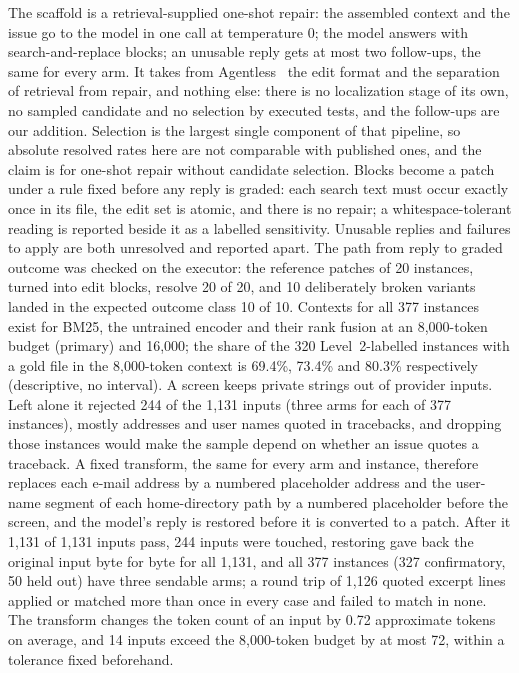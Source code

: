 \documentclass[10pt,twocolumn]{article}
\makeatletter
\renewcommand\paragraph{\@startsection{paragraph}{4}{\z@}{3pt}{-0.5em}{\normalfont\bfseries}}
\makeatother
\begin{document}
\paragraph{Scaffold and edit rules.} The scaffold is a retrieval-supplied one-shot repair: the assembled context and the issue go to the model in one
call at temperature 0; the model answers with search-and-replace blocks; an unusable reply gets at most two follow-ups, the same for every arm.
It takes from Agentless~\cite{agentless} the edit format and the separation of retrieval from repair, and nothing else: there is no localization stage of
its own, no sampled candidate and no selection by executed tests, and the follow-ups are our addition. Selection is the largest single component
of that pipeline, so absolute resolved rates here are not comparable with published ones, and the claim is for one-shot repair without candidate selection. %
Blocks become a patch under a rule fixed before any reply is graded: each search text must occur exactly once in its file, the edit set is
atomic, and there is no repair; a whitespace-tolerant reading is reported beside it as a labelled sensitivity. %
Unusable replies and failures to apply are both unresolved and reported apart. The path from reply to graded outcome was checked
on the executor: the reference patches of 20 instances, turned into edit blocks, resolve 20 of 20, and 10 deliberately broken variants
landed in the expected outcome class 10 of 10. %
Contexts for all 377 instances exist for BM25, the untrained encoder and their rank fusion at an 8,000-token budget (primary) and 16,000;
the share of the 320 Level~2-labelled instances with a gold file in the 8,000-token context is 69.4\%, 73.4\% and 80.3\% respectively
(descriptive, no interval). %
A screen keeps private strings out of provider inputs. Left alone it rejected 244 of the 1,131 inputs (three arms for each of 377 instances), mostly addresses and user names quoted in tracebacks, and dropping those instances
would make the sample depend on whether an issue quotes a traceback. A fixed transform, the same for every arm and instance, therefore replaces each e-mail address by a numbered placeholder address and the user-name segment of each home-directory path
by a numbered placeholder before the screen, and the model's reply is restored before it is converted to a patch. After it 1,131 of 1,131 inputs pass, 244 inputs were touched, restoring gave back the original input byte for byte for all 1,131,
and all 377 instances (327 confirmatory, 50 held out) have three sendable arms; a round trip of 1,126 quoted excerpt lines applied or matched more than once in every case and failed to match in none. %
The transform changes the token count of an input by 0.72 approximate tokens on average, and 14 inputs exceed the 8,000-token budget by at most 72, within a tolerance fixed beforehand. %
\end{document}
